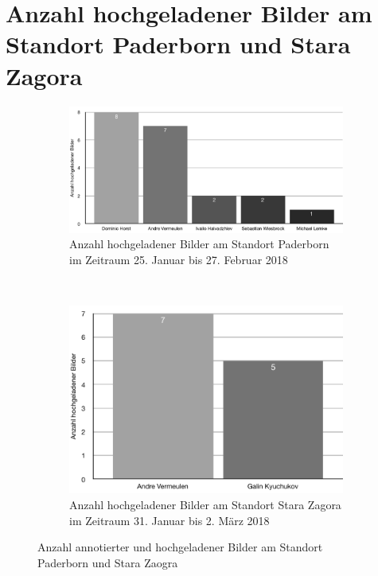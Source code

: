 \chapter{Anzahl hochgeladener Bilder am Standort Paderborn und Stara Zagora}
\begin{figure}[h]
  \begin{subfigure}[t]{0.4\textwidth}
    \centering
    \includegraphics[width=\textwidth]{data/usage_pb}
    \caption{Anzahl hochgeladener Bilder am Standort Paderborn im Zeitraum 25. Januar bis 27. Februar 2018}
    \label{fig:usagepb}
  \end{subfigure}
  ~
  \begin{subfigure}[t]{0.4\textwidth}
    \centering
    \includegraphics[width=\textwidth]{data/usage_bg}
    \caption{Anzahl hochgeladener Bilder am Standort Stara Zagora im Zeitraum 31. Januar bis 2. März 2018}
    \label{fig:usagebg}
  \end{subfigure}
  \centering
  \caption{Anzahl annotierter und hochgeladener Bilder am Standort Paderborn und Stara Zaogra}
\end{figure}
